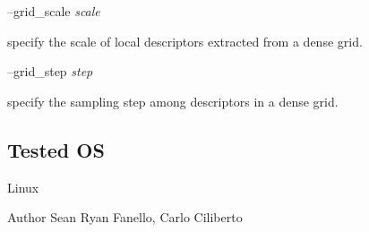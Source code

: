 --grid\+\_\+scale {\itshape scale} 
\begin{DoxyItemize}
\item specify the scale of local descriptors extracted from a dense grid.
\end{DoxyItemize}

--grid\+\_\+step {\itshape step} 
\begin{DoxyItemize}
\item specify the sampling step among descriptors in a dense grid.
\end{DoxyItemize}\hypertarget{group__icub__sparseCoder_tested_os_sec}{}\subsection{Tested OS}\label{group__icub__sparseCoder_tested_os_sec}
Linux

\begin{DoxyAuthor}{Author}
Sean Ryan Fanello, Carlo Ciliberto 
\end{DoxyAuthor}
